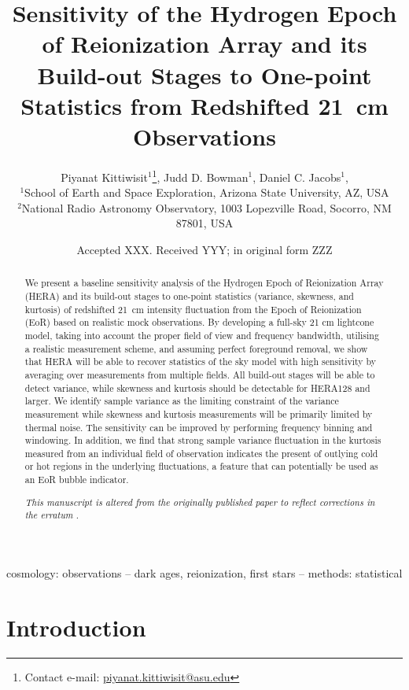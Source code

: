 \documentclass[fleqn,usenatbib]{mnras}
\title[Sensitivity of HERA to One-point Statistics]{Sensitivity of the Hydrogen Epoch of Reionization Array and its Build-out Stages to One-point Statistics from Redshifted 21~cm Observations}
\author[P. Kittiwisit et al.]{Piyanat Kittiwisit$^{1}$\thanks{Contact e-mail: \href{mailto:piyanat.kittiwisit@asu.edu}{piyanat.kittiwisit@asu.edu}},
Judd D. Bowman$^{1}$,
Daniel C. Jacobs$^{1}$,
\newauthor{Adam P. Beardsley$^{1}$,
and Nithyanandan Thyagarajan$^{1,2}$\thanks{Nithyanandan Thyagarajan is a Jansky Fellow of the National Radio
Astronomy Observatory.}}
\\
$^{1}$School of Earth and Space Exploration, Arizona State University, AZ, USA\\
$^{2}$National Radio Astronomy Observatory, 1003 Lopezville Road, Socorro, NM
87801, USA}
\date{Accepted XXX. Received YYY; in original form ZZZ}
\begin{document}
\label{firstpage}
\pagerange{\pageref{firstpage}--\pageref{lastpage}}
\maketitle

\begin{abstract}
We present a baseline sensitivity analysis of the Hydrogen Epoch of Reionization Array (HERA) and its build-out stages to one-point statistics (variance, skewness, and kurtosis) of redshifted 21~cm intensity fluctuation from the Epoch of Reionization (EoR) based on realistic mock observations. By developing a full-sky 21 cm lightcone model, taking into account the proper field of view and frequency bandwidth, utilising a realistic measurement scheme, and assuming perfect foreground removal, we show that HERA will be able to recover statistics of the sky model with high sensitivity by averaging over measurements from multiple fields. All build-out stages will be able to detect variance, while skewness and kurtosis should be detectable for HERA128 and larger. We identify sample variance as the limiting constraint of the variance measurement while skewness and kurtosis measurements will be primarily limited by thermal noise. The sensitivity can be improved by performing frequency binning and windowing. In addition, we find that strong sample variance fluctuation in the kurtosis measured from an individual field of observation indicates the present of outlying cold or hot regions in the underlying fluctuations, a feature that can potentially be used as an EoR bubble indicator.

\vspace{2ex}
\noindent \emph{This manuscript is altered from the originally published paper \citep{2018MNRAS.474.4487K} to reflect corrections in the erratum \citep{2018MNRAS.477..864K}}.
\end{abstract}

\begin{keywords}
cosmology: observations -- dark ages, reionization, first stars -- methods: statistical
\end{keywords}



\section{Introduction}
\label{sec:intro}
\end{document}
